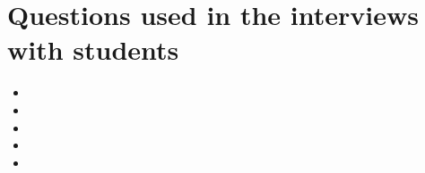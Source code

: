 







\section{Questions used in the interviews with students}
\label{sec:appqueststud}
\begin{itemize}
\item 

\item 

\item 

\item 

\item 

\end{itemize}